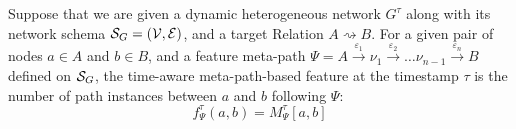 \begin{definition}
    Suppose that we are given a dynamic heterogeneous network $G^{\tau}$ along with its network schema $\mathcal{S}_G=(\mathcal{V}, \mathcal{E})$, and a target Relation $A\rightsquigarrow B$. For a given pair of nodes $a\in A$ and $b\in B$, and a feature meta-path $\Psi=A\xrightarrow{\varepsilon_1}\nu_1\xrightarrow{\varepsilon_2}\dots\nu_{n-1}\xrightarrow{\varepsilon_{n}}B$ defined on $\mathcal{S}_G$, the time-aware meta-path-based feature at the timestamp $\tau$ is the number of path instances between $a$ and $b$ following $\Psi$:
    \begin{equation*}
        f_{\Psi}^\tau(a,b)=M^\tau_{\Psi}[a,b]
    \end{equation*}
\end{definition}

